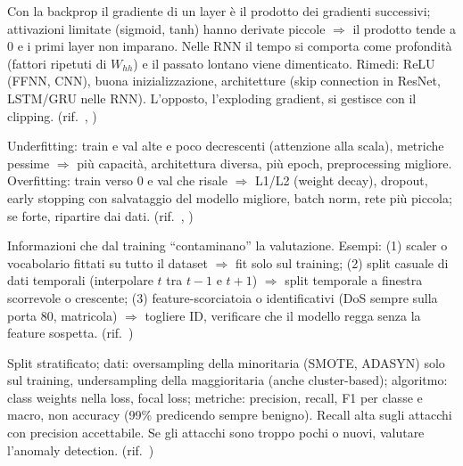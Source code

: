 \begin{soluzione}
Con la backprop il gradiente di un layer è il prodotto dei gradienti successivi; attivazioni limitate
        (sigmoid, tanh) hanno derivate piccole $\Rightarrow$ il prodotto tende a 0 e i primi layer non imparano. Nelle RNN il tempo si comporta come
        profondità (fattori ripetuti di $W_{hh}$) e il passato lontano viene dimenticato. Rimedi: ReLU (FFNN, CNN), buona inizializzazione,
        architetture (skip connection in ResNet, LSTM/GRU nelle RNN). L'opposto, l'exploding gradient, si gestisce con il clipping.
(rif.\ , )
\end{soluzione}

\begin{soluzione}
Underfitting: train e val alte e poco decrescenti (attenzione alla scala), metriche pessime $\Rightarrow$ più
        capacità, architettura diversa, più epoch, preprocessing migliore. Overfitting: train verso 0 e val che risale $\Rightarrow$ L1/L2
        (weight decay), dropout, early stopping con salvataggio del modello migliore, batch norm, rete più piccola; se forte, ripartire dai dati.
(rif.\ , )
\end{soluzione}

\begin{soluzione}[A7 -- Leakage]
Informazioni che dal training ``contaminano'' la valutazione. Esempi: (1) scaler o vocabolario fittati su tutto il
        dataset $\Rightarrow$ fit solo sul training; (2) split casuale di dati temporali (interpolare $t$ tra $t-1$ e $t+1$) $\Rightarrow$ split temporale
        a finestra scorrevole o crescente; (3) feature-scorciatoia o identificativi (DoS sempre sulla porta 80, matricola) $\Rightarrow$ togliere ID,
        verificare che il modello regga senza la feature sospetta.
(rif.\ )
\end{soluzione}

\begin{soluzione}[A8 -- Sbilanciamento]
Split stratificato; dati: oversampling della minoritaria (SMOTE, ADASYN) solo sul training,
        undersampling della maggioritaria (anche cluster-based); algoritmo: class weights nella loss, focal loss; metriche: precision, recall,
        F1 per classe e macro, non accuracy (99\% predicendo sempre benigno). Recall alta sugli attacchi con precision accettabile.
        Se gli attacchi sono troppo pochi o nuovi, valutare l'anomaly detection.
(rif.\ )
\end{soluzione}

